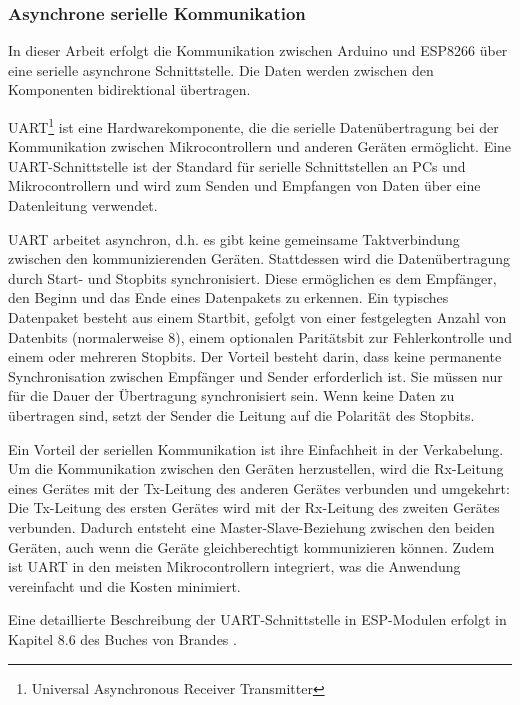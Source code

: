\documentclass[12pt, letterpaper]{article}
\begin{document}
  \subsubsection{Asynchrone serielle Kommunikation}
  \par In dieser Arbeit erfolgt die Kommunikation zwischen Arduino und ESP8266 über eine serielle asynchrone Schnittstelle. Die Daten werden zwischen den Komponenten bidirektional übertragen. 
  \par UART\footnote{Universal Asynchronous Receiver Transmitter} ist eine Hardwarekomponente, die die serielle Datenübertragung bei der Kommunikation zwischen Mikrocontrollern und anderen Geräten ermöglicht. Eine UART-Schnittstelle ist der Standard für serielle Schnittstellen an PCs und Mikrocontrollern und wird zum Senden und Empfangen von Daten über eine Datenleitung verwendet.
  \par UART arbeitet asynchron, d.h. es gibt keine gemeinsame Taktverbindung zwischen den kommunizierenden Geräten. Stattdessen wird die Datenübertragung durch Start- und Stopbits synchronisiert. Diese ermöglichen es dem Empfänger, den Beginn und das Ende eines Datenpakets zu erkennen. Ein typisches Datenpaket besteht aus einem Startbit, gefolgt von einer festgelegten Anzahl von Datenbits (normalerweise 8), einem optionalen Paritätsbit zur Fehlerkontrolle und einem oder mehreren Stopbits. Der Vorteil besteht darin, dass keine permanente Synchronisation zwischen Empfänger und Sender erforderlich ist. Sie müssen nur für die Dauer der Übertragung synchronisiert sein. Wenn keine Daten zu übertragen sind, setzt der Sender die Leitung auf die Polarität des Stopbits.
  \par Ein Vorteil der seriellen Kommunikation ist ihre Einfachheit in der Verkabelung. Um die Kommunikation zwischen den Geräten herzustellen, wird die Rx-Leitung eines Gerätes mit der Tx-Leitung des anderen Gerätes verbunden und umgekehrt: Die Tx-Leitung des ersten Gerätes wird mit der Rx-Leitung des zweiten Gerätes verbunden. Dadurch entsteht eine Master-Slave-Beziehung zwischen den beiden Geräten, auch wenn die Geräte gleichberechtigt kommunizieren können. Zudem ist UART in den meisten Mikrocontrollern integriert, was die Anwendung vereinfacht und die Kosten minimiert.
  \par Eine detaillierte Beschreibung der UART-Schnittstelle in ESP-Modulen erfolgt in Kapitel 8.6 des Buches von Brandes \cite[S. 500]{espbuch}.
  
\end{document}
